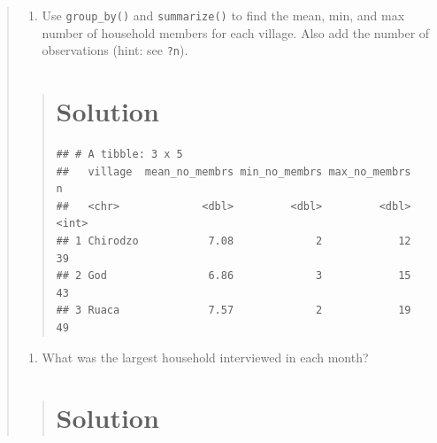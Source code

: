 \documentclass[]{book}
\newenvironment{Shaded}{\begin{snugshade}}{\end{snugshade}}
\newcommand{\KeywordTok}[1]{\textcolor[rgb]{0.13,0.29,0.53}{\textbf{#1}}}
\newcommand{\DataTypeTok}[1]{\textcolor[rgb]{0.13,0.29,0.53}{#1}}
\newcommand{\StringTok}[1]{\textcolor[rgb]{0.31,0.60,0.02}{#1}}
\newcommand{\OperatorTok}[1]{\textcolor[rgb]{0.81,0.36,0.00}{\textbf{#1}}}
\newcommand{\NormalTok}[1]{#1}
\providecommand{\tightlist}{%
  \setlength{\itemsep}{0pt}\setlength{\parskip}{0pt}}
\begin{document}
\begin{quote}
\begin{enumerate}
\def\labelenumi{\arabic{enumi}.}
\setcounter{enumi}{1}
\tightlist
\item
  Use \texttt{group\_by()} and \texttt{summarize()} to find the mean,
  min, and max number of household members for each village. Also add
  the number of observations (hint: see \texttt{?n}).
\end{enumerate}

\begin{quote}
\section{Solution}\label{solution-7}

\begin{Shaded}
\end{Shaded}

\begin{verbatim}
## # A tibble: 3 x 5
##   village  mean_no_membrs min_no_membrs max_no_membrs     n
##   <chr>             <dbl>         <dbl>         <dbl> <int>
## 1 Chirodzo           7.08             2            12    39
## 2 God                6.86             3            15    43
## 3 Ruaca              7.57             2            19    49
\end{verbatim}
\end{quote}

\begin{enumerate}
\def\labelenumi{\arabic{enumi}.}
\setcounter{enumi}{2}
\tightlist
\item
  What was the largest household interviewed in each month?
\end{enumerate}

\begin{quote}
\section{Solution}\label{solution-8}


\end{quote}
\end{quote}
\end{document}
